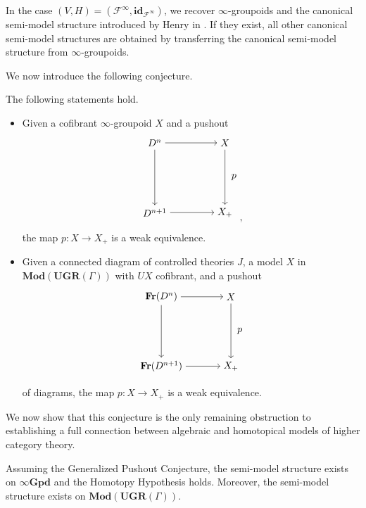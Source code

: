 \documentclass{tac}
\begin{document}
In the case $(V,H)=(\mathcal{F}^\infty,\mathbf{id}_{\mathcal{F}^\infty})$, we recover $\infty$-groupoids and the canonical semi-model structure introduced by Henry in \cite{Henry2016}. If they exist, all other canonical semi-model structures are obtained by transferring the canonical semi-model structure from $\infty$-groupoids.

We now introduce the following conjecture.

\begin{conjecture}\label{Gen_PO_Conj}
The following statements hold.
\begin{itemize}
    \item Given a cofibrant $\infty$-groupoid $X$ and a pushout
    \[
    \begin{tikzpicture}[node distance=2.5cm]
        \node(A) {$D^n$};
        \node (B) [right of=A]{$X$};
        \node(C)[below of=A]{$D^{n+1}$};
        \node (D)[right of=C]{$X_+$};
        \draw[->](B) to node[black,right=3]{$p$}(D);
        \draw[->](A) to node {}(B);
        \draw[->] (A) to node {}(C);
        \draw[->](C) to node {}(D);
    \end{tikzpicture},
    \]
    the map $p:X\to X_+$ is a weak equivalence.
    \item Given a connected diagram of controlled theories $J$, a model $X$ in $\mathbf{Mod}(\mathbf{UGR}(\Gamma))$ with $UX$ cofibrant, and a pushout
    \[
    \begin{tikzpicture}[node distance=2.5cm]
        \node(A) {$\mathbf{Fr} (D^n)$};
        \node (B) [right of=A]{$X$};
        \node(C)[below of=A]{$\mathbf{Fr}(D^{n+1})$};
        \node (D)[right of=C]{$X_+$};
        \draw[->](B) to node[black,right=3]{$p$}(D);
        \draw[->](A) to node {}(B);
        \draw[->] (A) to node {}(C);
        \draw[->](C) to node {}(D);
    \end{tikzpicture}
    \]
    of diagrams, the map $p:X\to X_+$ is a weak equivalence.
\end{itemize}
\end{conjecture}

We now show that this conjecture is the only remaining obstruction to establishing a full connection between algebraic and homotopical models of higher category theory.

\begin{theorem}
Assuming the Generalized Pushout Conjecture, the semi-model structure exists on $\infty\mathbf{Gpd}$ and the Homotopy Hypothesis holds. Moreover, the semi-model structure exists on $\mathbf{Mod}(\mathbf{UGR}(\Gamma))$.
\end{theorem}
\end{document}

